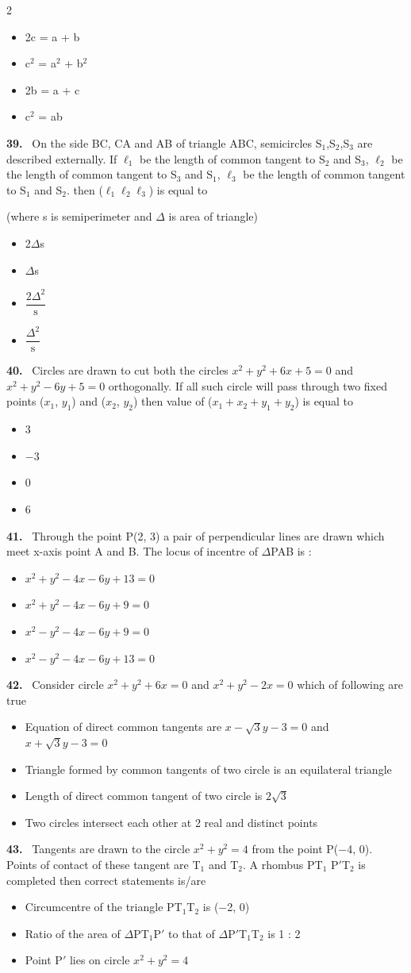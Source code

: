 \documentclass[10pt]{extarticle}
\newcommand{\qn}[1]{\par\smallskip\noindent\textbf{#1.}~}
\newenvironment{qoptions}{\begin{itemize}[leftmargin=1.8em,itemsep=1pt,topsep=2pt,label={}]}{\end{itemize}}
\newcommand{\opt}[2]{\item[(#1)] #2}
\begin{document}
\begin{multicols}{2}
\begin{qoptions}
\opt{A}{2c = a + b}
\opt{B}{c$^2$ = a$^2$ + b$^2$}
\opt{C}{2b = a + c}
\opt{D}{c$^2$ = ab}
\end{qoptions}
\qn{39} On the side BC, CA and AB of triangle ABC, semicircles S$_1$,S$_2$,S$_3$ are described externally. If $\ell_1$ be the length of common tangent to S$_2$ and S$_3$, $\ell_2$ be the length of common tangent to S$_3$ and S$_1$, $\ell_3$ be the length of common tangent to S$_1$ and S$_2$. then ($\ell_1\ell_2\ell_3$) is equal to\par
(where s is semiperimeter and $\Delta$ is area of triangle)
\begin{qoptions}
\opt{A}{2$\Delta$s}
\opt{B}{$\Delta$s}
\opt{C}{$\dfrac{2\Delta^2}{\mathrm s}$}
\opt{D}{$\dfrac{\Delta^2}{\mathrm s}$}
\end{qoptions}
\qn{40} Circles are drawn to cut both the circles $x^2+y^2+6x+5=0$ and $x^2+y^2-6y+5=0$ orthogonally. If all such circle will pass through two fixed points ($x_1$, $y_1$) and ($x_2$, $y_2$) then value of ($x_1+x_2+y_1+y_2$) is equal to
\begin{qoptions}
\opt{A}{3}
\opt{B}{$-$3}
\opt{C}{0}
\opt{D}{6}
\end{qoptions}
\qn{41} Through the point P(2, 3) a pair of perpendicular lines are drawn which meet x-axis point A and B. The locus of incentre of $\Delta$PAB is :
\begin{qoptions}
\opt{A}{$x^2+y^2-4x-6y+13=0$}
\opt{B}{$x^2+y^2-4x-6y+9=0$}
\opt{C}{$x^2-y^2-4x-6y+9=0$}
\opt{D}{$x^2-y^2-4x-6y+13=0$}
\end{qoptions}
\qn{42} Consider circle $x^2+y^2+6x=0$ and $x^2+y^2-2x=0$ which of following are true
\begin{qoptions}
\opt{A}{Equation of direct common tangents are $x-\sqrt3y-3=0$ and $x+\sqrt3y-3=0$}
\opt{B}{Triangle formed by common tangents of two circle is an equilateral triangle}
\opt{C}{Length of direct common tangent of two circle is $2\sqrt3$}
\opt{D}{Two circles intersect each other at 2 real and distinct points}
\end{qoptions}
\qn{43} Tangents are drawn to the circle $x^2+y^2=4$ from the point P($-$4, 0). Points of contact of these tangent are T$_1$ and T$_2$. A rhombus PT$_1$ P$'$T$_2$ is completed then correct statements is/are
\begin{qoptions}
\opt{A}{Circumcentre of the triangle PT$_1$T$_2$ is ($-$2, 0)}
\opt{B}{Ratio of the area of $\Delta$PT$_1$P$'$ to that of $\Delta$P$'$T$_1$T$_2$ is 1 : 2}
\opt{C}{Point P$'$ lies on circle $x^2+y^2=4$}

\end{qoptions}
\end{multicols}
\end{document}
